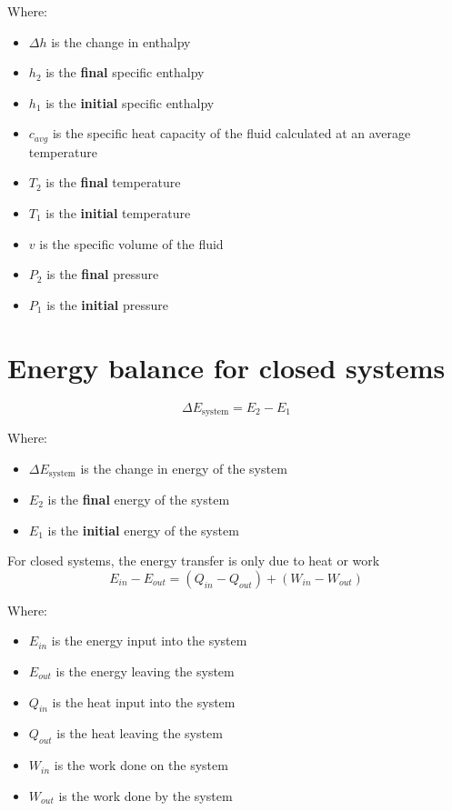 \documentclass[11pt]{article}
\begin{document}
Where:
\begin{itemize}
\item \(\Delta h\) is the change in enthalpy
\item \(h_2\) is the \textbf{final} specific enthalpy
\item \(h_1\) is the \textbf{initial} specific enthalpy
\item \(c_{avg}\) is the specific heat capacity of the fluid calculated at an average temperature
\item \(T_2\) is the \textbf{final} temperature
\item \(T_1\) is the \textbf{initial} temperature
\item \(v\) is the specific volume of the fluid
\item \(P_2\) is the \textbf{final} pressure
\item \(P_1\) is the \textbf{initial} pressure
\end{itemize}

\newpage

\section{Energy balance for closed systems}
\label{sec:org5b9a66f}
\[\Delta E_{\text{system}} = E_2 - E_1\]

Where:
\begin{itemize}
\item \(\Delta E_{\text{system}}\) is the change in energy of the system
\item \(E_2\) is the \textbf{final} energy of the system
\item \(E_1\) is the \textbf{initial} energy of the system
\end{itemize}

For closed systems, the energy transfer is only due to heat or work
\[E_{in} - E_{out} = (Q_{in} - Q_{out}) + (W_{in} - W_{out})\]

Where:
\begin{itemize}
\item \(E_{in}\) is the energy input into the system
\item \(E_{out}\) is the energy leaving the system
\item \(Q_{in}\) is the heat input into the system
\item \(Q_{out}\) is the heat leaving the system
\item \(W_{in}\) is the work done on the system
\item \(W_{out}\) is the work done by the system
\end{itemize}
\end{document}
